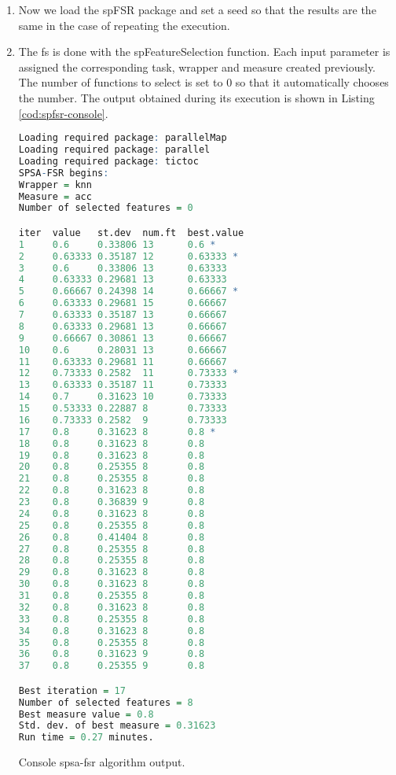 \begin{enumerate}
    \item Now we load the spFSR package and set a seed so that the results are the same in the case of repeating the execution.
    
    \item The \acrshort{fs} is done with the spFeatureSelection function. Each input parameter is assigned the corresponding task, wrapper and measure created previously. The number of functions to select is set to 0 so that it automatically chooses the number. The output obtained during its execution is shown in Listing \ref{cod:spfsr-console}.
    
\begin{codefloat}[H]
\begin{lstlisting}[language=R, style=console]
Loading required package: parallelMap
Loading required package: parallel
Loading required package: tictoc
SPSA-FSR begins:
Wrapper = knn
Measure = acc
Number of selected features = 0

iter  value   st.dev  num.ft  best.value
1     0.6     0.33806 13      0.6 *
2     0.63333 0.35187 12      0.63333 *
3     0.6     0.33806 13      0.63333
4     0.63333 0.29681 13      0.63333
5     0.66667 0.24398 14      0.66667 *
6     0.63333 0.29681 15      0.66667
7     0.63333 0.35187 13      0.66667
8     0.63333 0.29681 13      0.66667
9     0.66667 0.30861 13      0.66667
10    0.6     0.28031 13      0.66667
11    0.63333 0.29681 11      0.66667
12    0.73333 0.2582  11      0.73333 *
13    0.63333 0.35187 11      0.73333
14    0.7     0.31623 10      0.73333
15    0.53333 0.22887 8       0.73333
16    0.73333 0.2582  9       0.73333
17    0.8     0.31623 8       0.8 *
18    0.8     0.31623 8       0.8
19    0.8     0.31623 8       0.8
20    0.8     0.25355 8       0.8
21    0.8     0.25355 8       0.8
22    0.8     0.31623 8       0.8
23    0.8     0.36839 9       0.8
24    0.8     0.31623 8       0.8
25    0.8     0.25355 8       0.8
26    0.8     0.41404 8       0.8
27    0.8     0.25355 8       0.8
28    0.8     0.25355 8       0.8
29    0.8     0.31623 8       0.8
30    0.8     0.31623 8       0.8
31    0.8     0.25355 8       0.8
32    0.8     0.31623 8       0.8
33    0.8     0.25355 8       0.8
34    0.8     0.31623 8       0.8
35    0.8     0.25355 8       0.8
36    0.8     0.31623 9       0.8
37    0.8     0.25355 9       0.8

Best iteration = 17
Number of selected features = 8
Best measure value = 0.8
Std. dev. of best measure = 0.31623
Run time = 0.27 minutes.
\end{lstlisting}
\caption{Console \acrshort{spsa-fsr} algorithm output.}
\label{cod:spfsr-console}
\end{codefloat}


\end{enumerate}
